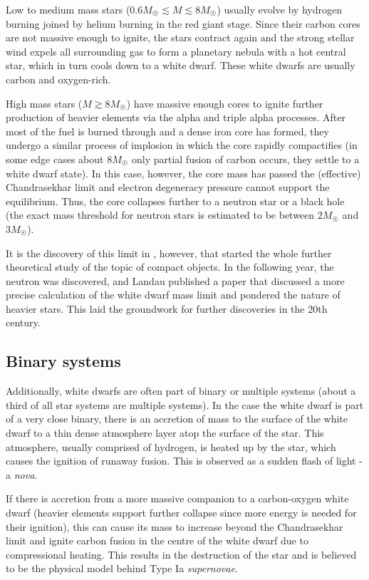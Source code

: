 \documentclass[]{article}
\begin{document}
	Low to medium mass stars ($0.6 M_{\astrosun} \lesssim M \lesssim 8 M_{\astrosun}$) usually evolve by hydrogen burning joined by helium burning in the red giant stage. Since their carbon cores are not massive enough to ignite, the stars contract again and the strong stellar wind expels all surrounding gas to form a planetary nebula with a hot central star, which in turn cools down to a white dwarf. These white dwarfs are usually carbon and oxygen-rich.

	High mass stars ($M \gtrsim 8 M_{\astrosun}$) have massive enough cores to ignite further production of heavier elements via the alpha and triple alpha processes. After most of the fuel is burned through and a dense iron core has formed, they undergo a similar process of implosion in which the core rapidly compactifies (in some edge cases about $8 M_{\astrosun}$ only partial fusion of carbon occurs, they settle to a white dwarf state). In this case, however, the core mass has passed the (effective) Chandrasekhar limit and electron degeneracy pressure cannot support the equilibrium. Thus, the core collapses further to a neutron star or a black hole (the exact mass threshold for neutron stars is estimated to be between $2 M_{\astrosun}$ and $3 M_{\astrosun}$).

	It is the discovery of this limit in \cite{Chandrasekhar1931}, however, that started the whole further theoretical study of the topic of compact objects. In the following year, the neutron was discovered, and Landau published a paper that discussed a more precise calculation of the white dwarf mass limit and pondered the nature of heavier stars. This laid the groundwork for further discoveries in the 20th century.

	\subsection{Binary systems}
	Additionally, white dwarfs are often part of binary or multiple systems (about a third of all star systems are multiple systems). In the case the white dwarf is part of a very close binary, there is an accretion of mass to the surface of the white dwarf to a thin dense atmosphere layer atop the surface of the star. This atmosphere, usually comprised of hydrogen, is heated up by the star, which causes the ignition of runaway fusion. This is observed as a sudden flash of light - a \emph{nova}.

	If there is accretion from a more massive companion to a carbon-oxygen white dwarf (heavier elements support further collapse since more energy is needed for their ignition), this can cause its mass to increase beyond the Chandrasekhar limit and ignite carbon fusion in the centre of the white dwarf due to compressional heating. This results in the destruction of the star and is believed to be the physical model behind Type Ia \emph{supernovae}.
	
\end{document}
